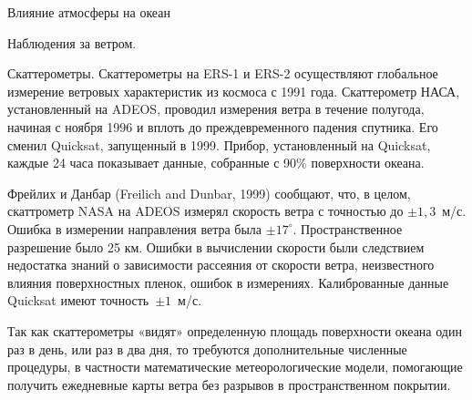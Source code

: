 \begin{chapter}{Влияние атмосферы на океан}
\begin{section}{Наблюдения за ветром.}
\begin{paragraph}{Скаттерометры.}
Скаттерометры на ERS-1 и ERS-2 осуществляют глобальное измерение
ветровых характеристик из космоса с 1991 года. Скаттерометр НАСА,
установленный на ADEOS, проводил измерения ветра в течение полугода,
начиная с ноября 1996 и вплоть до преждевременного падения
спутника. Его сменил Quicksat, запущенный в 1999. Прибор,
установленный на Quicksat, каждые 24 часа показывает данные, собранные
с 90\% поверхности океана.
%

Фрейлих и Данбар (Freilich and Dunbar, 1999) сообщают, что, в целом,
скаттрометр NASA на ADEOS измерял скорость ветра с точностью до 
$\pm 1,3$~м/с. Ошибка в измерении направления ветра была 
$\pm 17^\circ$. Пространственное разрешение было 25 км. Ошибки в вычислении
скорости были следствием недостатка знаний о зависимости рассеяния от
скорости ветра, неизвестного влияния поверхностных пленок, ошибок в
измерениях. Калиброванные данные Quicksat имеют точность~$\pm 1$~м/с.
%


Так как скаттерометры «видят» определенную площадь поверхности океана
один раз в день, или раз в два дня, то требуются дополнительные
численные процедуры, в частности математические метеорологические
модели, помогающие получить ежедневные карты ветра без разрывов в
пространственном покрытии.
%


\end{paragraph}
\end{section}
\end{chapter}
